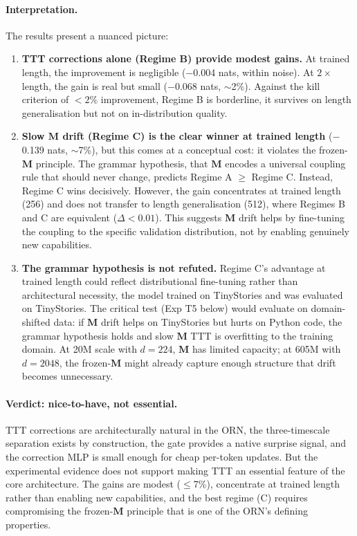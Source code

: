 \documentclass[11pt, a4paper]{article}
\newcommand{\M}{\mathbf{M}}
\theoremstyle{plain}
\theoremstyle{definition}
\theoremstyle{remark}
\begin{document}
\paragraph{Interpretation.}
The results present a nuanced picture:

\begin{enumerate}[nosep]
\item \textbf{TTT corrections alone (Regime B) provide modest gains.}
      At trained length, the improvement is negligible ($-$0.004 nats, within noise).
      At $2\times$ length, the gain is real but small ($-$0.068 nats, $\sim$2\%).
      Against the kill criterion of $<2\%$ improvement, Regime B is borderline, it survives on length generalisation but not on in-distribution quality.

\item \textbf{Slow $\M$ drift (Regime C) is the clear winner at trained length} ($-$0.139 nats, $\sim$7\%), but this comes at a conceptual cost: it violates the frozen-$\M$ principle.
      The grammar hypothesis, that $\M$ encodes a universal coupling rule that should never change, predicts Regime A $\geq$ Regime C.
      Instead, Regime C wins decisively.
      However, the gain concentrates at trained length (256) and does not transfer to length generalisation (512), where Regimes B and C are equivalent ($\Delta < 0.01$).
      This suggests $\M$ drift helps by fine-tuning the coupling to the specific validation distribution, not by enabling genuinely new capabilities.

\item \textbf{The grammar hypothesis is not refuted.}
      Regime C's advantage at trained length could reflect distributional fine-tuning rather than architectural necessity, the model trained on TinyStories and was evaluated on TinyStories.
      The critical test (Exp T5 below) would evaluate on domain-shifted data: if $\M$ drift helps on TinyStories but hurts on Python code, the grammar hypothesis holds and slow $\M$ TTT is overfitting to the training domain.
      At 20M scale with $d{=}224$, $\M$ has limited capacity; at 605M with $d{=}2048$, the frozen-$\M$ might already capture enough structure that drift becomes unnecessary.
\end{enumerate}

\paragraph{Verdict: nice-to-have, not essential.}
TTT corrections are architecturally natural in the ORN, the three-timescale separation exists by construction, the gate provides a native surprise signal, and the correction MLP is small enough for cheap per-token updates.
But the experimental evidence does not support making TTT an essential feature of the core architecture.
The gains are modest ($\leq$7\%), concentrate at trained length rather than enabling new capabilities, and the best regime (C) requires compromising the frozen-$\M$ principle that is one of the ORN's defining properties.
\end{document}
